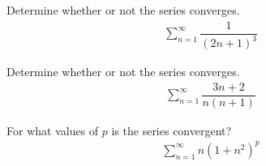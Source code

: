 \begin{exercise}
Determine whether or not the series converges.
\begin{align*}
    \sum_{n=1}^{\infty} \dfrac{1}{(2n+1)^{3}}
\end{align*}
\end{exercise}

\begin{exercise}
Determine whether or not the series converges.
\begin{align*}
    \sum_{n=1}^{\infty} \dfrac{3n+2}{n(n+1)}
\end{align*}
\end{exercise}

\begin{exercise}
For what values of $p$ is the series convergent?
\begin{align*}
    \sum_{n=1}^{\infty} n(1+n^{2})^{p}
\end{align*}
\end{exercise}